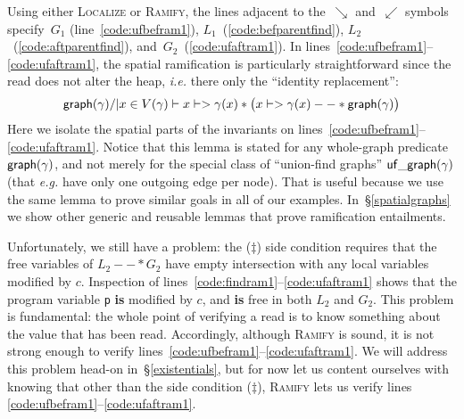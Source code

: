 Using either \textsc{Localize} or \textsc{Ramify}, the lines adjacent to the~$\searrow$ and~$\swarrow$ symbols specify~$G_1$ (line~\ref{code:ufbefram1}), $L_1$~(\ref{code:befparentfind}),
$L_2$~(\ref{code:aftparentfind}), and~$G_2$~(\ref{code:ufaftram1}). In lines~\ref{code:ufbefram1}--\ref{code:ufaftram1}, the spatial ramification is particularly straightforward since the read does not alter the heap, \emph{i.e.} there only the ``identity replacement'':
\[
\mathsf{graph}(\gamma) /| x \in V(\gamma) |- x |-> \gamma(x) * \big(x |-> \gamma(x) --* \mathsf{graph}(\gamma)\big)
\]
Here we isolate the spatial parts of the invariants on lines~\ref{code:ufbefram1}--\ref{code:ufaftram1}.  Notice that this lemma is stated for any whole-graph predicate $\mathsf{graph}(\gamma)$, and not merely for the special class of ``union-find graphs'' $\mathsf{uf\_graph}(\gamma)$ (that \emph{e.g.} have only one outgoing edge per node).  That is useful because we use the same lemma to prove similar goals in all of our examples.
In~\S\ref{spatialgraphs} we show other generic and reusable lemmas that prove ramification entailments.

Unfortunately, we still have a problem: the ($\ddagger$) side condition requires that the free variables of $L_2 --* G_2$ have empty intersection with any local variables modified by $c$.  Inspection of lines~\ref{code:findram1}--\ref{code:ufaftram1} shows that the program variable \texttt{p} \textbf{is} modified by $c$, and \textbf{is} free in both $L_2$ and $G_2$.  This problem is fundamental: the whole point of verifying a read is to know something about the value that has been read.  Accordingly, although \textsc{Ramify} is sound, it is not strong enough to verify
lines~\ref{code:ufbefram1}--\ref{code:ufaftram1}.  We will address this problem head-on in~\S\ref{existentials}, but for now let us content ourselves with knowing that other than the side condition ($\ddagger$), \textsc{Ramify} lets us verify lines \ref{code:ufbefram1}--\ref{code:ufaftram1}.

